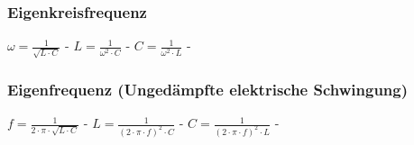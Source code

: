 \subsubsection{Eigenkreisfrequenz} 
\begin{minipage}{0.45\textwidth} 
\end{minipage} 
\begin{minipage}{0.45\textwidth} 
 
\legende{}\end{minipage} 
 
$ \omega  = \frac{ 1}{\sqrt{L\cdot C}} $ - $ L= \frac{ 1}{\omega ^{2} \cdot C} $ - $ C = \frac{ 1}{\omega ^{2} \cdot L} $ - \\ 
 
\subsubsection{Eigenfrequenz (Ungedämpfte elektrische Schwingung)} 
\begin{minipage}{0.45\textwidth} 
\end{minipage} 
\begin{minipage}{0.45\textwidth} 
 
\legende{}\end{minipage} 
 
$ f = \frac{ 1}{2\cdot \pi \cdot \sqrt{L\cdot C}} $ - $ L = \frac{ 1}{(2\cdot \pi \cdot f)^{2} \cdot C} $ - $ C = \frac{ 1}{(2\cdot \pi \cdot f)^{2} \cdot L} $ - \\ 
 

